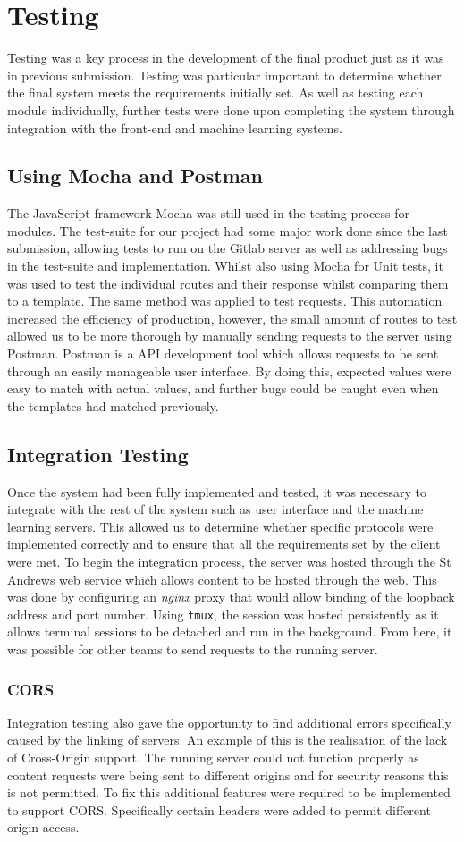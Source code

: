 \section{Testing}
Testing was a key process in the development of the final product just as it was in previous submission. Testing was particular important to determine whether the final system meets the requirements initially set. As well as testing each module individually, further tests were done upon completing the system through integration with the front-end and machine learning systems.

\subsection{Using Mocha and Postman}
The JavaScript framework Mocha was still used in the testing process for modules. The test-suite for our project had some major work done since the last submission, allowing tests to run on the Gitlab server as well as addressing bugs in the test-suite and implementation. Whilst also using Mocha for Unit tests, it was used to test the individual routes and their response whilst comparing them to a template. The same method was applied to test requests. This automation increased the efficiency of production, however, the small amount of routes to test allowed us to be more thorough by manually sending requests to the server using Postman. Postman is a API development tool which allows requests to be sent through an easily manageable user interface. By doing this, expected values were easy to match with actual values, and further bugs could be caught even when the templates had matched previously. 
\subsection{Integration Testing}
Once the system had been fully implemented and tested, it was necessary to integrate with the rest of the system such as user interface and the machine learning servers. This allowed us to determine whether specific protocols were implemented correctly and to ensure that all the requirements set by the client were met. To begin the integration process, the server was hosted through the St Andrews web service which allows content to be hosted through the web. This was done by configuring an \textit{nginx} proxy that would allow binding of the loopback address and port number. Using \texttt{tmux}, the session was hosted persistently as it allows terminal sessions to be detached and run in the background. From here, it was possible for other teams to send requests to the running server. 
\subsubsection{CORS}
Integration testing also gave the opportunity to find additional errors specifically caused by the linking of servers. An example of this is the realisation of the lack of Cross-Origin support. The running server could not function properly as content requests were being sent to different origins and for security reasons this is not permitted. To fix this additional features were required to be implemented to support CORS. Specifically certain headers were added to permit different origin access.